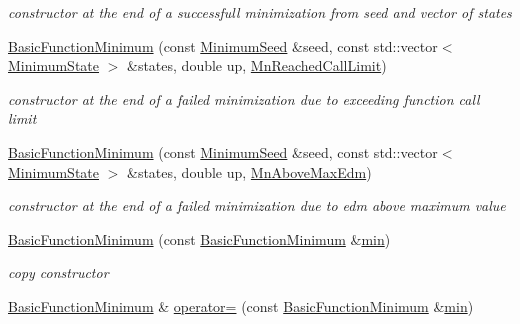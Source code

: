 \begin{DoxyCompactItemize}
\begin{DoxyCompactList}\small\item\em constructor at the end of a successfull minimization from seed and vector of states \end{DoxyCompactList}\item 
\mbox{\hyperlink{classROOT_1_1Minuit2_1_1BasicFunctionMinimum_a2a15d2336acfb9f3be41de8e477c191a}{Basic\+Function\+Minimum}} (const \mbox{\hyperlink{classROOT_1_1Minuit2_1_1MinimumSeed}{Minimum\+Seed}} \&seed, const std\+::vector$<$ \mbox{\hyperlink{classROOT_1_1Minuit2_1_1MinimumState}{Minimum\+State}} $>$ \&states, double up, \mbox{\hyperlink{classROOT_1_1Minuit2_1_1BasicFunctionMinimum_1_1MnReachedCallLimit}{Mn\+Reached\+Call\+Limit}})
\begin{DoxyCompactList}\small\item\em constructor at the end of a failed minimization due to exceeding function call limit \end{DoxyCompactList}\item 
\mbox{\hyperlink{classROOT_1_1Minuit2_1_1BasicFunctionMinimum_ae30a460175a2bbf715f3ee0d6092c8b6}{Basic\+Function\+Minimum}} (const \mbox{\hyperlink{classROOT_1_1Minuit2_1_1MinimumSeed}{Minimum\+Seed}} \&seed, const std\+::vector$<$ \mbox{\hyperlink{classROOT_1_1Minuit2_1_1MinimumState}{Minimum\+State}} $>$ \&states, double up, \mbox{\hyperlink{classROOT_1_1Minuit2_1_1BasicFunctionMinimum_1_1MnAboveMaxEdm}{Mn\+Above\+Max\+Edm}})
\begin{DoxyCompactList}\small\item\em constructor at the end of a failed minimization due to edm above maximum value \end{DoxyCompactList}\item 
\mbox{\hyperlink{classROOT_1_1Minuit2_1_1BasicFunctionMinimum_ae0812dcb933989ffd9e096792367d0b7}{Basic\+Function\+Minimum}} (const \mbox{\hyperlink{classROOT_1_1Minuit2_1_1BasicFunctionMinimum}{Basic\+Function\+Minimum}} \&\mbox{\hyperlink{SU3__internal_8h_ab0f5fed3171eb00d1c5f037d9f518a23}{min}})
\begin{DoxyCompactList}\small\item\em copy constructor \end{DoxyCompactList}\item 
\mbox{\hyperlink{classROOT_1_1Minuit2_1_1BasicFunctionMinimum}{Basic\+Function\+Minimum}} \& \mbox{\hyperlink{classROOT_1_1Minuit2_1_1BasicFunctionMinimum_ad143c1c314e041649151bac9bb9e7a91}{operator=}} (const \mbox{\hyperlink{classROOT_1_1Minuit2_1_1BasicFunctionMinimum}{Basic\+Function\+Minimum}} \&\mbox{\hyperlink{SU3__internal_8h_ab0f5fed3171eb00d1c5f037d9f518a23}{min}})

\end{DoxyCompactItemize}
